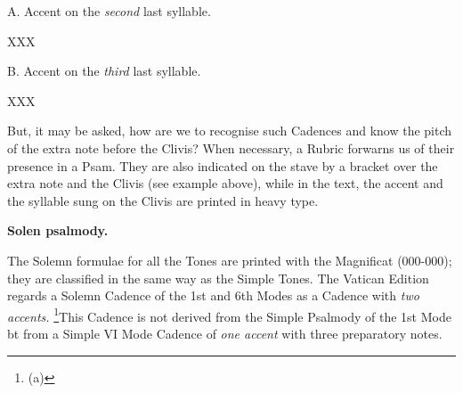 A. Accent on the {\it second} last syllable.

XXX

B. Accent on the {\it third} last syllable.

XXX

But, it may be asked, how are we to recognise such Cadences and know the pitch of the extra note before the Clivis? When necessary, a Rubric forwarns us of their presence in a Psam. They are also indicated on the stave by a bracket over the extra note and the Clivis (see example above), while in the text, the accent and the syllable sung on the Clivis are printed in heavy type.

{\bf Solen psalmody.}

The Solemn formulae for all the Tones are printed with the Magnificat (000-000); they are classified in the same way as the Simple Tones. The Vatican Edition regards a Solemn Cadence of the 1st and 6th Modes as a Cadence with {\it two accents.} \footnote{(a)}{This Cadence is not derived from the Simple Psalmody of the 1st Mode bt from a Simple VI Mode Cadence of {\it one accent} with three preparatory notes.}


